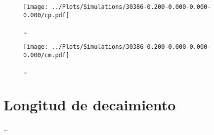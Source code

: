 \begin{figure}
    \centering
    \texttt{[image: ../Plots/Simulations/30386-0.200-0.000-0.000-0.000/cp.pdf]}
    \caption{\dots}
    \label{fig:cp_i}
\end{figure}

\begin{figure}
    \centering
    \texttt{[image: ../Plots/Simulations/30386-0.200-0.000-0.000-0.000/cm.pdf]}
    \caption{\dots}
    \label{fig:cm_i}
\end{figure}

\section{Longitud de decaimiento}

\dots
